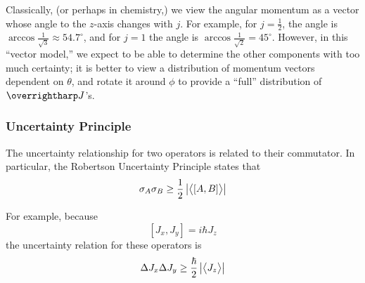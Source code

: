 Classically, (or perhaps in chemistry,) we view the angular momentum as a vector whose angle to the \(z\)-axis changes with \(j\). For example, for \(j=\frac{1}{2}\), the angle is \(\arccos\frac{1}{\sqrt{3}}\approx 54.7^\circ\), and for \(j=1\) the angle is \(\arccos\frac{1}{\sqrt{2}}=45^\circ\). However, in this ``vector model,'' we expect to be able to determine the other components with too much certainty; it is better to view a distribution of momentum vectors dependent on \(\theta\), and rotate it around \(\phi\) to provide a ``full'' distribution of \(\vv{J}\)'s.

\subsubsection{Uncertainty Principle}
The uncertainty relationship for two operators is related to their commutator. In particular, the Robertson Uncertainty Principle states that
\begin{equation}
	\sigma_A\sigma_B\geq \frac{1}{2}\left|\left\langle \begin{matrix}[A,B]\end{matrix} \right\rangle\right|\label{eq3:uncertaintyprinciple}
\end{equation}

For example, because
\[[J_x, J_y]=i\hbar J_z\]
the uncertainty relation for these operators is
\[\Delta J_x \Delta J_y \geq \frac{\hbar}{2}\left|\left\langle \begin{matrix}J_z\end{matrix} \right\rangle\right|\]

